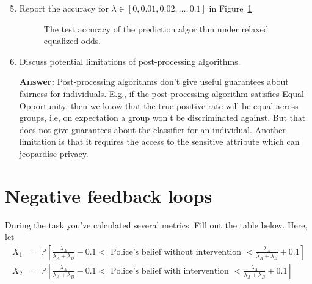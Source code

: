 \begin{enumerate}
	\setcounter{enumi}{4}
	\item  Report the accuracy for $\lambda \in [0 ,0.01, 0.02, \dots, 0.1]$ in Figure~\ref{fig:eqodds}.
	
	\begin{figure}[h]
		\centering
		\caption{The test accuracy of the prediction algorithm under relaxed equalized odds.}
		\label{fig:eqodds}
	\end{figure}
	
	\item Discuss potential limitations of post-processing algorithms.
	
	\textbf{Answer:} Post-processing algorithms don't give useful guarantees about fairness for individuals. E.g., if the post-processing algorithm satisfies Equal Opportunity, then we
know that the true positive rate will be equal across groups, i.e, on expectation a group won't be discriminated against. But that does not give guarantees about the classifier for an individual. Another limitation is that it requires the access to the sensitive attribute which can jeopardise privacy.
\end{enumerate}

\section{Negative feedback loops}
During the task you've calculated several metrics. Fill out the table below. Here, let
\begin{align*}
	X_1 &= \mathbb{P}\left[\frac{\lambda_A}{\lambda_A + \lambda_B}-0.1< \text{ Police's belief without intervention } <\frac{\lambda_A}{\lambda_A + \lambda_B}+0.1\right] \\
	X_2 &= \mathbb{P}\left[\frac{\lambda_A}{\lambda_A + \lambda_B}-0.1< \text{ Police's belief with intervention } <\frac{\lambda_A}{\lambda_A + \lambda_B}+0.1\right] 
\end{align*}

